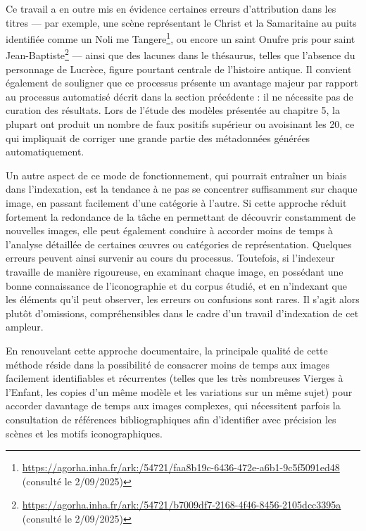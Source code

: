 Ce travail a en outre mis en évidence certaines erreurs d’attribution dans les titres — par exemple, une scène représentant le Christ et la Samaritaine au puits identifiée comme un Noli me Tangere\footnote{\url{https://agorha.inha.fr/ark:/54721/faa8b19c-6436-472e-a6b1-9c5f5091ed48} (consulté le 2/09/2025)}, ou encore un saint Onufre pris pour saint Jean-Baptiste\footnote{\url{https://agorha.inha.fr/ark:/54721/b7009df7-2168-4f46-8456-2105dcc3395a} (consulté le 2/09/2025)} — ainsi que des lacunes dans le thésaurus, telles que l’absence du personnage de Lucrèce, figure pourtant centrale de l’histoire antique. Il convient également de souligner que ce processus présente un avantage majeur par rapport au processus automatisé décrit dans la section précédente : il ne nécessite pas de curation des résultats. Lors de l’étude des modèles présentée au chapitre 5, la plupart ont produit un nombre de faux positifs supérieur ou avoisinant les 20, ce qui impliquait de corriger une grande partie des métadonnées générées automatiquement.

Un autre aspect de ce mode de fonctionnement, qui pourrait entraîner un biais dans l’indexation, est la tendance à ne pas se concentrer suffisamment sur chaque image, en passant facilement d’une catégorie à l’autre. Si cette approche réduit fortement la redondance de la tâche en permettant de découvrir constamment de nouvelles images, elle peut également conduire à accorder moins de temps à l’analyse détaillée de certaines œuvres ou catégories de représentation. Quelques erreurs peuvent ainsi survenir au cours du processus. Toutefois, si l’indexeur travaille de manière rigoureuse, en examinant chaque image, en possédant une bonne connaissance de l’iconographie et du corpus étudié, et en n’indexant que les éléments qu’il peut observer, les erreurs ou confusions sont rares. Il s’agit alors plutôt d’omissions, compréhensibles dans le cadre d’un travail d’indexation de cet ampleur.

En renouvelant cette approche documentaire, la principale qualité de cette méthode réside dans la possibilité de consacrer moins de temps aux images facilement identifiables et récurrentes (telles que les très nombreuses Vierges à l’Enfant, les copies d’un même modèle et les variations sur un même sujet) pour accorder davantage de temps aux images complexes, qui nécessitent parfois la consultation de références bibliographiques afin d’identifier avec précision les scènes et les motifs iconographiques.
